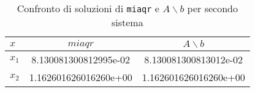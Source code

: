 \FloatBarrier
\begin{table}[ht]
   \centering
   \renewcommand\arraystretch{2}
   \begin{tabular}{| l | c c |}
      \hline
      $x$     & $miaqr$               & $A \backslash b$      \\
      \hline
      $x_{1}$ & 8.130081300812995e-02 & 8.130081300813012e-02 \\
      $x_{2}$ & 1.162601626016260e+00 & 1.162601626016260e+00 \\
      \hline
   \end{tabular}
   \caption{Confronto di soluzioni di \lstinline{miaqr} e $A \backslash b$ per secondo sistema}
   \label{tab:12_2}
\end{table}
\FloatBarrier

